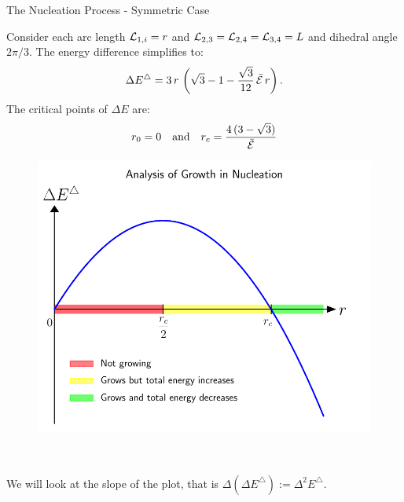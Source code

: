 \documentclass[usenames,dvipsnames]{beamer}
\begin{document}
\begin{frame}{The Nucleation Process - Symmetric Case}
\begin{minipage}{0.5\textwidth}
Consider each arc length $\mathcal{L}_{1,i} = r$ and $\mathcal{L}_{2,3}=\mathcal{L}_{2,4}=\mathcal{L}_{3,4}=L$ and dihedral angle $2\pi/3$. The energy difference simplifies to:
\begin{equation*}
    \Delta E^{\triangle} = 3\,r\,\left(\sqrt{3}-1-\frac{\sqrt{3}}{12}\,\bar{\mathcal{E}}\,r\right).
\end{equation*}
 The critical points of $\Delta E$ are:
\begin{equation*}
     r_0 = 0\quad\text{and}\quad r_c = \dfrac{4\,(3 - \sqrt{3})}{\bar{\SE}}%
\end{equation*}
\end{minipage}\hfill
\begin{minipage}{0.45\textwidth}
\begin{figure}
    \centering
    \includegraphics[trim={0 1em 0 2.5em},clip=true,scale=0.44]{figures/stored_energy/DeltaETriangle.pdf}
\end{figure}
\end{minipage}\\
\begin{minipage}{\textwidth}
\vspace{1em}
We will look at the slope of the plot, that is $\Delta(\Delta E^{\triangle}):= \Delta^2E^{\triangle}$.
\end{minipage}

\end{frame}
\end{document}
